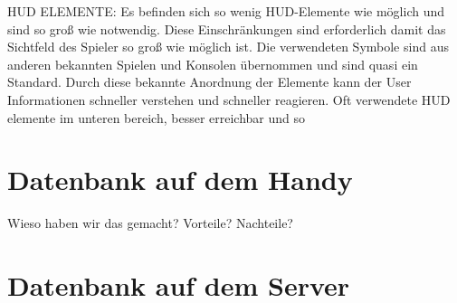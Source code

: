 	HUD ELEMENTE: Es befinden sich so wenig HUD-Elemente wie möglich und sind so groß wie notwendig. Diese Einschränkungen sind erforderlich damit das Sichtfeld des Spieler so groß wie möglich ist. Die verwendeten Symbole sind aus anderen bekannten Spielen und Konsolen übernommen und sind quasi ein Standard. Durch diese bekannte Anordnung der Elemente kann der User Informationen schneller verstehen und schneller reagieren. Oft verwendete HUD elemente im unteren bereich, besser erreichbar und so 

\section{Datenbank auf dem Handy}
	Wieso haben wir das gemacht? Vorteile? Nachteile?
	
\section{Datenbank auf dem Server}